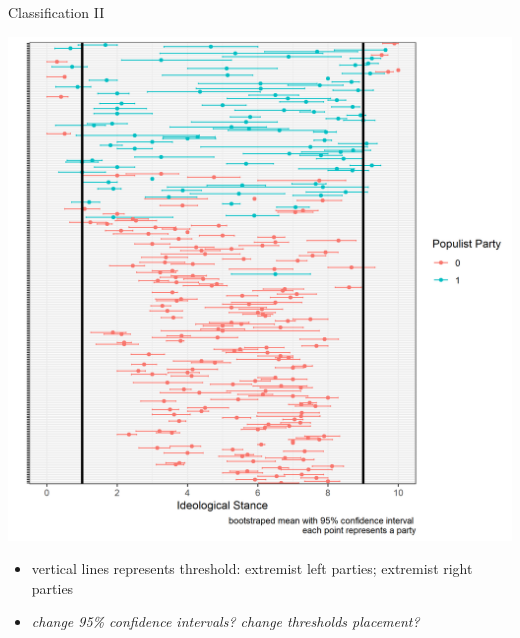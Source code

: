 \documentclass[
  ignorenonframetext,
]{beamer}
\providecommand{\tightlist}{%
  \setlength{\itemsep}{0pt}\setlength{\parskip}{0pt}}
\begin{document}
\begin{frame}{Classification II}
\protect\hypertarget{classification-ii}{}

\begin{center}\includegraphics[width=0.9\linewidth,height=0.7\textheight]{PNG/lrgen_CHES} \end{center}

\begin{itemize}
\tightlist
\item
  vertical lines represents threshold: extremist left parties; extremist
  right parties
\item
  \emph{change 95\% confidence intervals? change thresholds placement?}
\end{itemize}

\end{frame}
\end{document}
